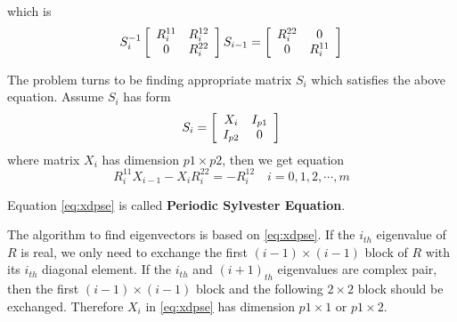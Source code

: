 which is
\[
S^{-1}_{i}
\left[
\begin{array}{c c}
  R^{11}_{i} & R^{12}_{i} \\
  0 & R^{22}_{i}
\end{array}
\right]
S_{i-1}=
\left[
\begin{array}{c c}
  R^{22}_{i} & 0 \\
  0 & R^{11}_{i}
\end{array}
\right]
\]

The problem turns to be finding appropriate matrix $S_{i}$ which satisfies
the above equation. Assume $S_{i}$ has form
\[
S_{i}=
\left[
\begin{array}{c c}
  X_{i} & I_{p1} \\
  I_{p2} & 0
\end{array}
\right]
\]
where matrix $X_{i}$ has dimension $p1\times p2$, then we get equation
\begin{equation}
  \label{eq:xdpse}
  R^{11}_{i}X_{i-1}-X_{i}R^{22}_{i}=-R^{12}_{i} \quad i=0,1,2,\cdots,m
\end{equation}

Equation \eqref{eq:xdpse} is called \textbf{Periodic Sylvester Equation}.

The algorithm to find eigenvectors is based on \eqref{eq:xdpse}. If the
$i_{th}$ eigenvalue of $R$ is real, we only need to exchange the first
$(i-1)\times (i-1)$ block of $R$ with its $i_{th}$ diagonal element.
If the $i_{th}$ and $(i+1)_{th}$ eigenvalues are complex pair, then
the first $(i-1)\times (i-1)$ block and the following $2\times 2$
block should be exchanged. Therefore $X_{i}$ in \eqref{eq:xdpse}
has dimension $p1\times 1$ or $p1\times 2$.

